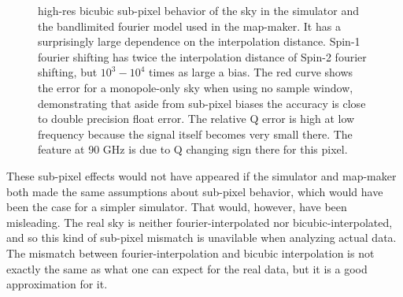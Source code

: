 \documentclass{article}
\begin{document}
\begin{figure}
{	high-res bicubic sub-pixel behavior of the sky in the simulator and the
	bandlimited fourier model used in the map-maker. It has a surprisingly large
	dependence on the interpolation distance. Spin-1 fourier shifting has
	twice the interpolation distance of Spin-2 fourier shifting, but $10^3-10^4$
	times as large a bias. The red curve shows the error for a
	monopole-only sky when using no sample window, demonstrating
	that aside from sub-pixel biases the accuracy is close to double
	precision float error.
	The relative Q error is high at low frequency because the signal itself
	becomes very small there. The feature at 90 GHz is due to Q changing
	sign there for this pixel.
	}
	\label{fig:subpixel-spec}
\end{figure}

These sub-pixel effects would not have appeared if the simulator
and map-maker both made the same assumptions about sub-pixel behavior,
which would have been the case for a simpler simulator.
That would, however, have been misleading. The real sky is neither
fourier-interpolated nor bicubic-interpolated, and so this kind of
sub-pixel mismatch is unavilable when analyzing actual data. The
mismatch between fourier-interpolation and bicubic interpolation
is not exactly the same as what one can expect for the real data,
but it is a good approximation for it.


\end{document}
